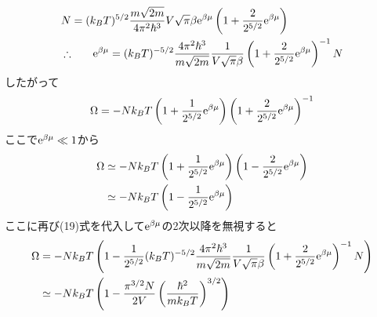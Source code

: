 \begin{align}
  \begin{split}
    N&=(k_BT)^{5/2}\frac{m\sqrt{2m}}{4\pi^2\hbar^3}V\sqrt{\pi}\beta{\rm e}^{\beta\mu}\left(1+\frac{2}{2^{5/2}}{\rm e}^{\beta\mu}\right)\\
    \therefore&\qquad{\rm e}^{\beta\mu}=(k_BT)^{-5/2}\frac{4\pi^2\hbar^3}{m\sqrt{2m}}\frac{1}{V\sqrt{\pi}\beta}\left(1+\frac{2}{2^{5/2}}{\rm e}^{\beta\mu}\right)^{-1}N
  \end{split}
\end{align}
したがって
\begin{align}
  \Omega=-Nk_BT\left(1+\frac{1}{2^{5/2}}{\rm e}^{\beta\mu}\right)\left(1+\frac{2}{2^{5/2}}{\rm e}^{\beta\mu}\right)^{-1}
\end{align}
ここで${\rm e}^{\beta\mu}\ll 1$から
\begin{align}
  \begin{split}
    \Omega&\simeq-Nk_BT\left(1+\frac{1}{2^{5/2}}{\rm e}^{\beta\mu}\right)\left(1-\frac{2}{2^{5/2}}{\rm e}^{\beta\mu}\right)\\
    &\simeq-Nk_BT\left(1-\frac{1}{2^{5/2}}{\rm e}^{\beta\mu}\right)
  \end{split}
\end{align}
ここに再び(19)式を代入して${\rm e}^{\beta\mu}$の2次以降を無視すると
\begin{align}
  \begin{split}
    \Omega&=-Nk_BT\left(1-\frac{1}{2^{5/2}}(k_BT)^{-5/2}\frac{4\pi^2\hbar^3}{m\sqrt{2m}}\frac{1}{V\sqrt{\pi}\beta}\left(1+\frac{2}{2^{5/2}}{\rm e}^{\beta\mu}\right)^{-1}N\right)\\
    &\simeq-Nk_BT\left(1-\frac{\pi^{3/2}N}{2V}\left(\frac{\hbar^2}{mk_BT}\right)^{3/2}\right)
  \end{split}
\end{align}